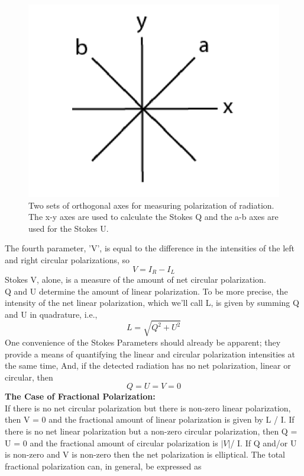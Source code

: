\documentclass[10pt]{report}
\begin{document}
\begin{figure}\label{figsto.ong}
\includegraphics[scale=1]{figsto.png}
\caption{ Two sets of orthogonal axes for measuring polarization of radiation.  The x-y axes are used to calculate the Stokes Q and the a-b axes are used for the Stokes U.  }
\end{figure}  
The fourth parameter, 'V', is equal to the difference in the intensities of the left and right circular polarizations, so
\begin{equation}
V=I_R-I_L
\end{equation}
Stokes V, alone, is a measure of the amount of net circular polarization.\\
Q and U determine the amount of linear polarization.  To be more precise, the intensity of the net linear polarization, which we'll call L, is given by summing Q and U in quadrature, i.e., 
\begin{equation}
L=\sqrt{Q^2+U^2}
\end{equation}
One convenience of the Stokes Parameters should already be apparent; they provide a means of quantifying the linear and circular polarization intensities at the same time,  And, if the detected radiation has no net polarization, linear or circular, then
\begin{equation}
Q=U=V=0
\end{equation}
\textbf{The Case of Fractional Polarization:}\\
If there is no net circular polarization but there is non-zero linear polarization, then V = 0 and the fractional amount of linear polarization is given by L / I.  If there is no net linear polarization but a non-zero circular polarization, then Q = U = 0 and the fractional amount of circular polarization is $|V|$/ I.  If Q and/or U is non-zero and V is non-zero then the net polarization is elliptical.  The total fractional polarization can, in general, be expressed as  
\end{document}
